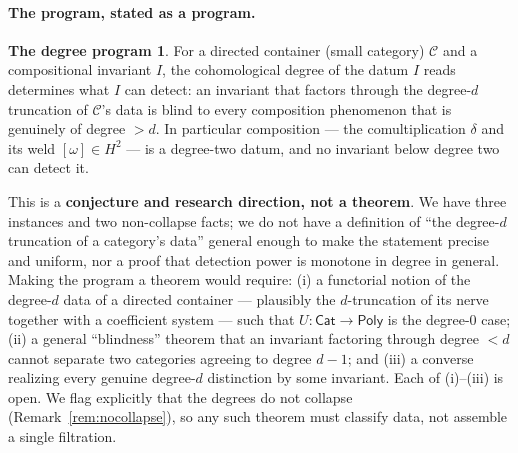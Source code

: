 \documentclass[11pt]{article}
\theoremstyle{definition}
\newtheorem*{program}{The degree program}
\newcommand{\Poly}{\mathsf{Poly}}
\newcommand{\Cat}{\mathsf{Cat}}
\newcommand{\cC}{\mathcal{C}}
\begin{document}
\paragraph{The program, stated as a program.}
\begin{program}
For a directed container (small category) $\cC$ and a compositional invariant $I$, the cohomological
degree of the datum $I$ reads determines what $I$ can detect: an invariant that factors through the
degree-$d$ truncation of $\cC$'s data is blind to every composition phenomenon that is genuinely of
degree $>d$. In particular composition --- the comultiplication $\delta$ and its weld $[\omega]\in
H^2$ --- is a degree-two datum, and no invariant below degree two can detect it.
\end{program}
This is a \textbf{conjecture and research direction, not a theorem}. We have three instances and
two non-collapse facts; we do not have a definition of ``the degree-$d$ truncation of a category's
data'' general enough to make the statement precise and uniform, nor a proof that detection power is
monotone in degree in general. Making the program a theorem would require: (i) a functorial notion
of the degree-$d$ data of a directed container --- plausibly the $d$-truncation of its nerve
together with a coefficient system --- such that $U\colon\Cat\to\Poly$ is the degree-$0$ case; (ii)
a general ``blindness'' theorem that an invariant factoring through degree $<d$ cannot separate two
categories agreeing to degree $d-1$; and (iii) a converse realizing every genuine degree-$d$
distinction by some invariant. Each of (i)--(iii) is open. We flag explicitly that the degrees do
not collapse (Remark~\ref{rem:nocollapse}), so any such theorem must classify data, not assemble a
single filtration.
\end{document}
